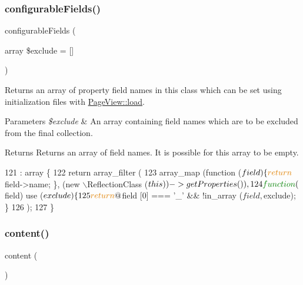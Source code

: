 \subsubsection{\texorpdfstring{configurable\+Fields()}{configurableFields()}}
{\footnotesize\ttfamily configurable\+Fields (\begin{DoxyParamCaption}\item[{array}]{\$exclude = {\ttfamily \mbox{[}\mbox{]}} }\end{DoxyParamCaption})\hspace{0.3cm}{\ttfamily [private]}}

Returns an array of property field names in this class which can be set using initialization files with \hyperlink{class_lora_1_1_page_view_a2cb0c3fbaa3e77419479aef9716f1ce3}{Page\+View\+::load}. 
\begin{DoxyParams}{Parameters}
{\em \$exclude} & An array containing field names which are to be excluded from the final collection. \\
\hline
\end{DoxyParams}
\begin{DoxyReturn}{Returns}
Returns an array of field names. It is possible for this array to be empty. 
\end{DoxyReturn}

\begin{DoxyCode}
121                                                               : array \{
122         \textcolor{keywordflow}{return} array\_filter (
123             array\_map (\textcolor{keyword}{function} ($field) \{ \textcolor{keywordflow}{return} $field->name; \}, (new \(\backslash\)ReflectionClass ($this))->
      getProperties ()),
124             \textcolor{keyword}{function} ($field) use ($exclude) \{
125                 \textcolor{keywordflow}{return} @$field [0] === \textcolor{charliteral}{'\_'} && !in\_array ($field, $exclude); \}
126         );
127     \}
\end{DoxyCode}
\mbox{\label{class_lora_1_1_page_view_a9b80bb36f89498eac4f43bf08461240d}} 
\subsubsection{\texorpdfstring{content()}{content()}}
{\footnotesize\ttfamily content (\begin{DoxyParamCaption}{ }\end{DoxyParamCaption})}


